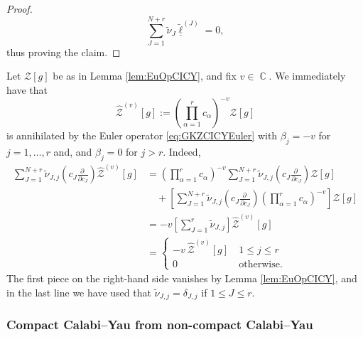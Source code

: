 \documentclass[12pt,a4paper,oneside]{amsart}
\numberwithin{equation}{section}
\theoremstyle{definition}
\theoremstyle{remark}
\DeclareMathOperator{\C}{\mathbb{C}}
\newcommand{\mz}{\mathcal{Z}}
\begin{document}
\begin{appendix}
\begin{proof}
\begin{equation*}
         \sum_{J=1}^{N+r} \tilde{\nu}_{J} \underline{\tilde{\ell}}^{(J)} = 0 ,
    \end{equation*}
    thus proving the claim.
\end{proof}
Let $\mz [g]$ be as in Lemma \ref{lem:EuOpCICY}, and fix $v \in \C$. We immediately have that
\begin{equation*}
    \widehat{\mz}^{(v)}[g] := \left( \prod_{\alpha=1}^{r} c_{\alpha} \right)^{-v} \mz [g]
\end{equation*}
is annihilated by the Euler operator \eqref{eq:GKZCICYEuler} with $\beta_j=-v$ for $j=1, \dots, r$ and, and $\beta_j=0$ for $j>r$. Indeed, 
\begin{equation*}
\begin{aligned}
    \sum_{J=1}^{N+r} \tilde{\nu}_{J,j} \left( c_J \frac{\partial \ }{\partial c_J} \right)  \widehat{\mz}^{(v)}[g] &= \left( \prod_{\alpha=1}^{r} c_{\alpha} \right)^{-v}  \sum_{J=1}^{N+r} \tilde{\nu}_{J,j} \left( c_J \frac{\partial \ }{\partial c_J} \right)  \mz [g] \\
    & \quad + \left[ \sum_{J=1}^{N+r} \tilde{\nu}_{J,j} \left( c_J \frac{\partial \ }{\partial c_J} \right) \left( \prod_{\alpha=1}^{r} c_{\alpha} \right)^{-v} \right] \mz [g] \\
    &= -v  \left[ \sum_{J=1}^{r} \tilde{\nu}_{J,j} \right]  \widehat{\mz}^{(v)}[g] \\
    &= \begin{cases} -v ~ \widehat{\mz}^{(v)}[g] & \ 1 \le j \le r \\ 0 & \ \text{otherwise} . \end{cases}
\end{aligned}
\end{equation*}
The first piece on the right-hand side vanishes by Lemma \ref{lem:EuOpCICY}, and in the last line we have used that $ \tilde{\nu}_{J,j} = \delta_{J,j}$ if $1 \le J \le r$.



\subsubsection{Compact Calabi--Yau from non-compact Calabi--Yau}
\label{app:sec:prefactor}


\end{appendix}
\end{document}
